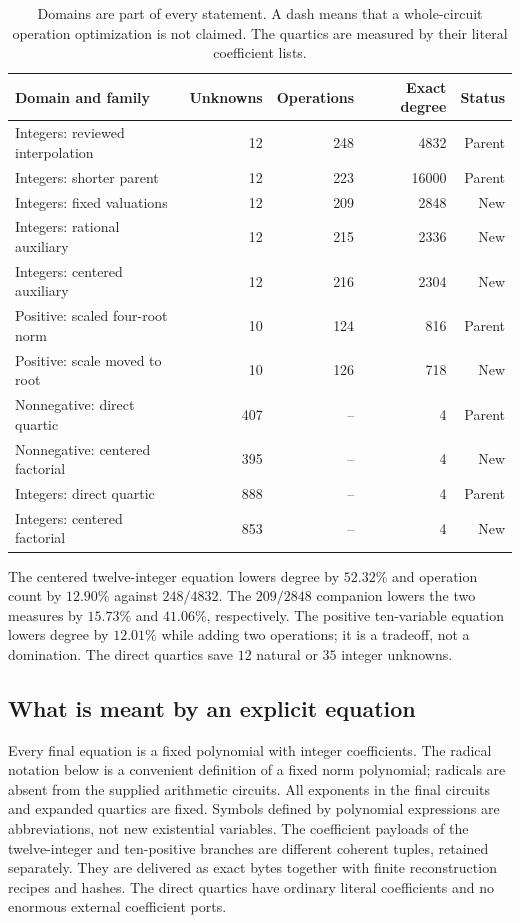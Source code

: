\documentclass[11pt,letterpaper]{article}
\theoremstyle{definition}\newtheorem{definition}[theorem]{Definition}
\theoremstyle{remark}\newtheorem{remark}[theorem]{Remark}
\begin{document}
\begin{table}[ht]
\centering\small
\begin{tabular}{lrrrr}
\toprule
Domain and family & Unknowns & Operations & Exact degree & Status\\
\midrule
Integers: reviewed interpolation &12&248&4832&Parent\\
Integers: shorter parent &12&223&16000&Parent\\
Integers: fixed valuations &12&209&2848&New\\
Integers: rational auxiliary &12&215&2336&New\\
Integers: centered auxiliary &12&216&2304&New\\
Positive: scaled four-root norm &10&124&816&Parent\\
Positive: scale moved to root &10&126&718&New\\
Nonnegative: direct quartic &407&--&4&Parent\\
Nonnegative: centered factorial &395&--&4&New\\
Integers: direct quartic &888&--&4&Parent\\
Integers: centered factorial &853&--&4&New\\
\bottomrule
\end{tabular}
\caption{Domains are part of every statement. A dash means that a whole-circuit operation optimization is not claimed. The quartics are measured by their literal coefficient lists.}
\end{table}

The centered twelve-integer equation lowers degree by $52.32\%$ and operation count by $12.90\%$ against $248/4832$. The $209/2848$ companion lowers the two measures by $15.73\%$ and $41.06\%$, respectively. The positive ten-variable equation lowers degree by $12.01\%$ while adding two operations; it is a tradeoff, not a domination. The direct quartics save $12$ natural or $35$ integer unknowns.

\subsection{What is meant by an explicit equation}
Every final equation is a fixed polynomial with integer coefficients. The radical notation below is a convenient definition of a fixed norm polynomial; radicals are absent from the supplied arithmetic circuits. All exponents in the final circuits and expanded quartics are fixed. Symbols defined by polynomial expressions are abbreviations, not new existential variables. The coefficient payloads of the twelve-integer and ten-positive branches are different coherent tuples, retained separately. They are delivered as exact bytes together with finite reconstruction recipes and hashes. The direct quartics have ordinary literal coefficients and no enormous external coefficient ports.
\end{document}
